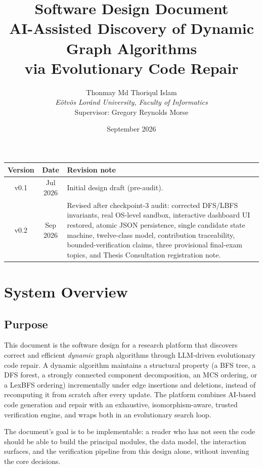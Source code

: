 \documentclass[12pt,a4paper]{article}
\title{Software Design Document\\[2pt]
\large AI-Assisted Discovery of Dynamic Graph Algorithms\\ via Evolutionary Code Repair}
\author{Thonmay Md Thoriqul Islam\\
\textit{E\"otv\"os Lor\'and University, Faculty of Informatics}\\
\small Supervisor: Gregory Reynolds Morse}
\date{September 2026}
\begin{document}
\maketitle

\begin{center}
\renewcommand{\arraystretch}{1.25}
\begin{tabular}{|c|c|p{8.5cm}|}
\hline
\textbf{Version} & \textbf{Date} & \textbf{Revision note} \\
\hline
v0.1 & Jul 2026 & Initial design draft (pre-audit). \\
\hline
v0.2 & Sep 2026 & Revised after checkpoint-3 audit: corrected DFS/LBFS invariants, real OS-level sandbox, interactive dashboard UI restored, atomic JSON persistence, single candidate state machine, twelve-class model, contribution traceability, bounded-verification claims, three provisional final-exam topics, and Thesis Consultation registration note. \\
\hline
\end{tabular}
\end{center}

\tableofcontents
\clearpage

\section{System Overview}
\label{sec:overview}

\subsection{Purpose}

This document is the software design for a research platform that discovers correct and efficient \emph{dynamic} graph algorithms through LLM-driven evolutionary code repair. A dynamic algorithm maintains a structural property (a BFS tree, a DFS forest, a strongly connected component decomposition, an MCS ordering, or a LexBFS ordering) incrementally under edge insertions and deletions, instead of recomputing it from scratch after every update. The platform combines AI-based code generation and repair with an exhaustive, isomorphism-aware, trusted verification engine, and wraps both in an evolutionary search loop.

The document's goal is to be implementable: a reader who has not seen the code should be able to build the principal modules, the data model, the interaction surfaces, and the verification pipeline from this design alone, without inventing the core decisions.
\end{document}
